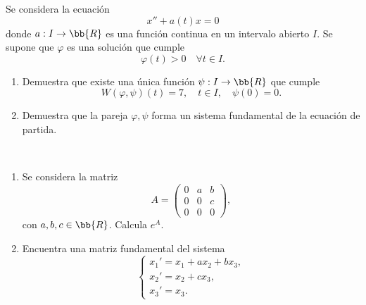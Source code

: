 \documentclass[12pt]{article}
\begin{document}
    \begin{ejercicio}
        Se considera la ecuación
        \[
            x'' + a(t)x = 0
        \]
        donde $a : I \to \bb{R}$ es una función continua en un intervalo abierto $I$. Se supone que $\varphi$ es una solución que cumple
        \[
            \varphi(t) > 0 \quad \forall t \in I.
        \]
        \begin{enumerate}
            \item Demuestra que existe una única función $\psi : I \to \bb{R}$ que cumple
            \[
                W(\varphi, \psi)(t) = 7, \quad t \in I, \quad \psi(0) = 0.
            \]
            \item Demuestra que la pareja $\varphi, \psi$ forma un sistema fundamental de la ecuación de partida.
        \end{enumerate}
    \end{ejercicio}

    \begin{ejercicio} ~
        \begin{enumerate}
            \item Se considera la matriz
            \[
                A = \begin{pmatrix}
                    0 & a & b \\
                    0 & 0 & c \\
                    0 & 0 & 0
                \end{pmatrix},
            \]
            con $a, b, c \in \bb{R}$. Calcula $e^A$.
            \item Encuentra una matriz fundamental del sistema
            \[
                \begin{cases}
                    x_1' = x_1 + ax_2 + bx_3, \\
                    x_2' = x_2 + cx_3, \\
                    x_3' = x_3.
                \end{cases}
            \]
        \end{enumerate}
    \end{ejercicio}
\end{document}

